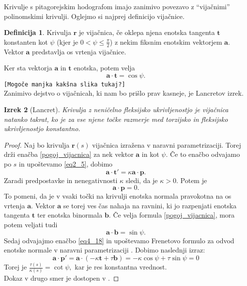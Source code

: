 \documentclass[12pt,a4paper,twoside]{article}
\theoremstyle{definition} %
\newtheorem{definicija}{Definicija}[section]
\theoremstyle{plain} %
\newtheorem{izrek}[definicija]{Izrek}
\numberwithin{equation}{section}  %
\begin{document}
Krivulje s pitagorejskim hodografom imajo zanimivo povezavo z ``vijačnimi'' polinomskimi krivulji. Oglejmo si najprej definicijo vijačnice.\cite{kreyszig2019differential}
\begin{definicija}
	Krivulja $\mathbf{r}$ je vijačnica, če oklepa njena enotska tangenta $\mathbf{t}$ konstanten kot $\psi$ (kjer je $0<\psi \leq \frac{\pi}{2}$) z nekim fiksnim enotskim vektorjem $\mathbf{a}.$ Vektor $\mathbf{a}$ predstavlja os vrtenja vijačnice.
\end{definicija}
Ker sta vektorja $\mathbf{a}$ in $\mathbf{t}$ enotska, potem velja
\begin{equation}
	\label{pogoj_vijacnica}
	\mathbf{a} \cdot \mathbf{t}=\cos \psi.
\end{equation}
\texttt{[Mogoče manjka kakšna slika tukaj?]}\\
Zanimivo dejstvo o vijačnicah, ki nam bo prišlo prav kasneje, je Lancretov izrek.\cite{kreyszig2019differential}
\begin{izrek}[Lancret]
	\label{lancret}
	Krivulja z neničelno fleksijsko ukrivljenostjo je vijačnica natanko takrat, ko je za vse njene točke razmerje med torzijsko in fleksijsko ukrivljenostjo konstantno.
\end{izrek}
\begin{proof}
	Naj bo krivulja $\mathbf{r}(s)$ vijačnica izražena v naravni parametrizaciji. Torej drži enačba \eqref{pogoj_vijacnica} za nek vektor $\mathbf{a}$ in kot $\psi.$ Če to enačbo odvajamo po $s$ in upoštevamo \eqref{eq2_5}, dobimo
	\begin{equation}
		\mathbf{a} \cdot \mathbf{t'}=\kappa \mathbf{a} \cdot \mathbf{p}.
	\end{equation}
	Zaradi predpostavke in nenegativnosti $\kappa$ sledi, da je $\kappa > 0.$ Potem je
	\begin{equation}
	\label{eq4_18}
	\mathbf{a} \cdot \mathbf{p}=0.
	\end{equation}
	To pomeni, da je v vsaki točki na krivulji enotska normala pravokotna na os vrtenja $\mathbf{a}.$ Vektor $\mathbf{a}$ se torej ves čas nahaja na ravnini, ki jo razpenjati enotska tangenta $\mathbf{t}$ ter enotska binormala $\mathbf{b}.$ Če velja formula \eqref{pogoj_vijacnica}, mora potem veljati tudi
	\begin{equation}
		\mathbf{a} \cdot \mathbf{b}=\sin \psi.
	\end{equation}
	Sedaj odvajajmo enačbo \eqref{eq4_18} in upoštevamo Frenetovo formulo za odvod enotske normale v naravni parametrizaciji \cite{kreyszig2019differential}. Dobimo naslednji izraz:
	\begin{equation}
		\mathbf{a} \cdot \mathbf{p'}=\mathbf{a} \cdot (-\kappa \mathbf{t}+\tau \mathbf{b})=-\kappa \cos \psi + \tau \sin \psi=0
	\end{equation}
	Torej je $\frac{\tau(s)}{\kappa(s)}=\cot \psi,$ kar je res konstantna vrednost.\\
	Dokaz v drugo smer je dostopen v \cite{kreyszig2019differential}.
\end{proof}
\end{document}

